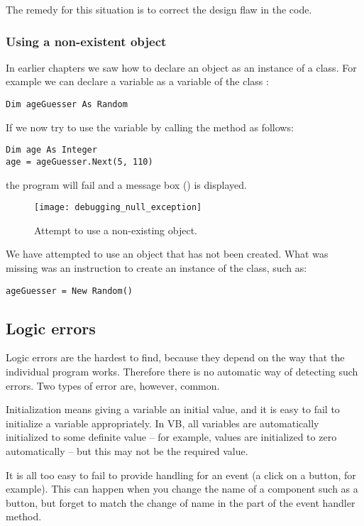 				The remedy for this situation is to correct the design flaw in the code.


			\subsubsection*{Using a non-existent object}
			In earlier chapters we saw how to declare an object as an instance of a class. For example we can declare a variable  as a variable of the class :
				\begin{lstlisting}
Dim ageGuesser As Random
				\end{lstlisting}
				If we now try to use the variable  by calling the method  as follows:
				\begin{lstlisting}
Dim age As Integer
age = ageGuesser.Next(5, 110)
				\end{lstlisting}
				the program will fail and a message box () is displayed.
				\begin{figure}[bth]
					\centering
					\texttt{[image: debugging\_null\_exception]}
					\caption{Attempt to use a non-existing object.}
					\label{fig:debugging_null_exception}
				\end{figure}

				
				We have attempted to use an object that has not been created. What was missing was an instruction to create an instance of the  class, such as:
				\begin{lstlisting}
ageGuesser = New Random()
				\end{lstlisting}
				
		
		\subsection*{Logic errors}
			Logic errors are the hardest to find, because they depend on the way that the individual program works. Therefore there is no automatic way of detecting such errors. Two types of error are, however, common.
			
			Initialization means giving a variable an initial value, and it is easy to fail to initialize a variable appropriately. In VB, all variables are automatically initialized to some definite value – for example,  values are initialized to zero automatically – but this may not be the required value.
			
			It is all too easy to fail to provide handling for an event (a click on a button, for example). This can happen when you change the name of a component such as a button, but forget to match the change of name in the  part of the event handler method.
			

